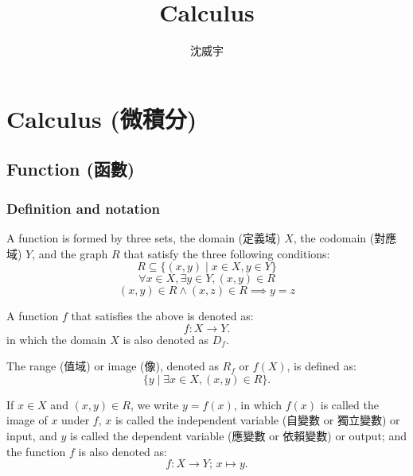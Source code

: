\documentclass[a4paper,12pt]{report}
\begin{document}
\title{Calculus}
\author{沈威宇}
\date{\temtoday}
\titletocdoc
\chapter{Calculus (微積分)}
\section{Function (函數)}
\subsection{Definition and notation}
A function is formed by three sets, the domain (定義域) $X$, the codomain (對應域) $Y$, and the graph $R$ that satisfy the three following conditions:
\[R\subseteq \{(x,y)\mid x\in X,y\in Y\}\]
\[\forall x\in X,\exists y\in Y,\left(x,y\right)\in R \]
\[ (x,y)\in R\land (x,z)\in R\implies y=z\]

A function $f$ that satisfies the above is denoted as:
\[f\colon X\to Y.\]
in which the domain $X$ is also denoted as $D_f$.

The range (值域) or image (像), denoted as $R_f$ or $f(X)$, is defined as:
\[\{ y \mid \exists x \in X, (x, y) \in R \}.\]

If $x\in X$ and $(x, y) \in R$, we write $y = f(x)$, in which $f(x)$ is called the image of $x$ under $f$, $x$ is called the independent variable (自變數 or 獨立變數) or input, and $y$ is called the dependent variable (應變數 or 依賴變數) or output; and the function $f$ is also denoted as:
\[f \colon X \to Y;\, x \mapsto y.\]
\end{document}
